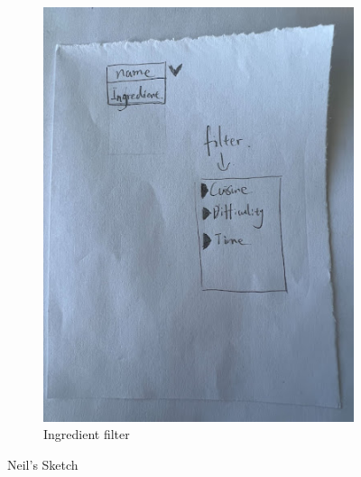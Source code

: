 \documentclass[11pt,english]{article}
\begin{document}
\begin{figure}
\begin{subfigure}[b]{0.4\linewidth}
    \includegraphics[width=\linewidth]{figure3v3.jpg}
    \caption{Ingredient filter}
  \end{subfigure}
  \caption{Neil's Sketch}
  \label{fig:figure3}
\end{figure}
\end{document}
